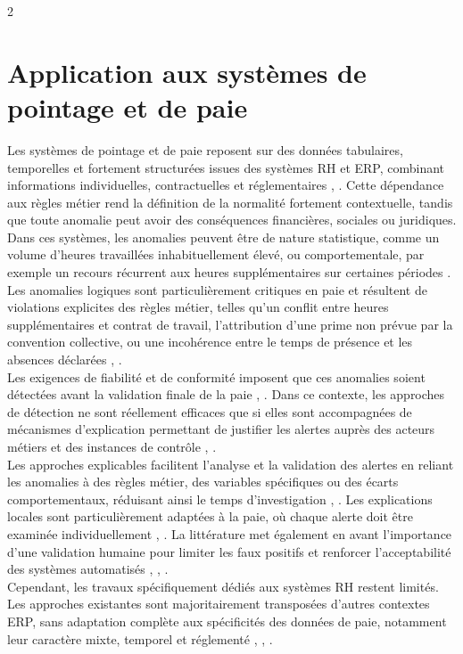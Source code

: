 \documentclass[10pt]{article}
\begin{document}
\begin{multicols}{2}
        
		\section{Application aux systèmes de pointage et de paie}
        Les systèmes de pointage et de paie reposent sur des données tabulaires, temporelles et fortement structurées issues des systèmes RH et ERP, combinant informations individuelles, contractuelles et réglementaires \cite{ref1}, \cite{ref2}. Cette dépendance aux règles métier rend la définition de la normalité fortement contextuelle, tandis que toute anomalie peut avoir des conséquences financières, sociales ou juridiques.\\
        Dans ces systèmes, les anomalies peuvent être de nature statistique, comme un volume d’heures travaillées inhabituellement élevé, ou comportementale, par exemple un recours récurrent aux heures supplémentaires sur certaines périodes \cite{ref12}. Les anomalies logiques sont particulièrement critiques en paie et résultent de violations explicites des règles métier, telles qu’un conflit entre heures supplémentaires et contrat de travail, l’attribution d’une prime non prévue par la convention collective, ou une incohérence entre le temps de présence et les absences déclarées \cite{ref7}, \cite{ref9}.\\
        Les exigences de fiabilité et de conformité imposent que ces anomalies soient détectées avant la validation finale de la paie \cite{ref3}, \cite{ref7}. Dans ce contexte, les approches de détection ne sont réellement efficaces que si elles sont accompagnées de mécanismes d’explication permettant de justifier les alertes auprès des acteurs métiers et des instances de contrôle \cite{ref4}, \cite{ref5}.\\
        Les approches explicables facilitent l’analyse et la validation des alertes en reliant les anomalies à des règles métier, des variables spécifiques ou des écarts comportementaux, réduisant ainsi le temps d’investigation \cite{ref7}, \cite{ref8}. Les explications locales sont particulièrement adaptées à la paie, où chaque alerte doit être examinée individuellement \cite{ref6}, \cite{ref11}. La littérature met également en avant l’importance d’une validation humaine pour limiter les faux positifs et renforcer l’acceptabilité des systèmes automatisés \cite{ref8}, \cite{ref12}, \cite{ref16}.\\
        Cependant, les travaux spécifiquement dédiés aux systèmes RH restent limités. Les approches existantes sont majoritairement transposées d’autres contextes ERP, sans adaptation complète aux spécificités des données de paie, notamment leur caractère mixte, temporel et réglementé \cite{ref2}, \cite{ref14}, \cite{ref15}.


\end{multicols}
\end{document}
